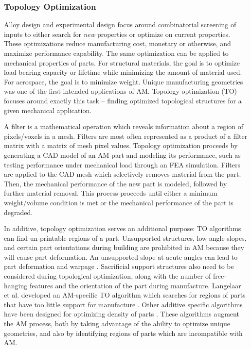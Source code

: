 \subsubsection{Topology Optimization} \label{sec:topology optimization}
Alloy design and experimental design focus around combinatorial screening of inputs to either search for \textit{new} properties or optimize on current properties. These optimizations reduce manufacturing cost, monetary or otherwise, and maximize performance capability. The same optimization can be applied to mechanical properties of parts. For structural materials, the goal is to optimize load bearing capacity or lifetime while minimizing the amount of material used. For aerospace, the goal is to minimize weight. Unique manufacturing geometries was one of the first intended applications of AM. Topology optimization (TO) focuses around exactly this task -- finding optimized topological structures for a given mechanical application. 

A filter is a mathematical operation which reveals information about a region of pixels/voxels in a mesh. Filters are most often represented as a product of a filter matrix with a matrix of mesh pixel values. Topology optimization proceeds by generating a CAD model of an AM part and modeling its performance, such as testing performance under mechanical load through an FEA simulation. Filters are applied to the CAD mesh which selectively removes material from the part. Then, the mechanical performance of the new part is modeled, followed by further material removal. This process proceeds until either a minimum weight/volume condition is met or the mechanical performance of the part is degraded.

In additive, topology optimization serves an additional purpose: TO algorithms can find un-printable regions of a part. Unsupported structures, low angle slopes, and certain part orientations during building are prohibited in AM because they will cause part deformation. An unsupported slope at acute angles can lead to part deformation and warpage \cite{Gaynor2016}. Sacrificial support structures also need to be considered during topological optimization, along with the number of free-hanging features and the orientation of the part during manufacture. Langelaar et al. developed an AM-specific TO algorithm which searches for regions of parts that have too little support for manufacture \cite{Langelaar2016, Langelaar2017}. Other additive specific algorithms have been designed for optimizing density of parts \cite{Zegard2016}. These algorithms augment the AM process, both by taking advantage of the ability to optimize unique geometries, and also by identifying regions of parts which are incompatible with AM.
